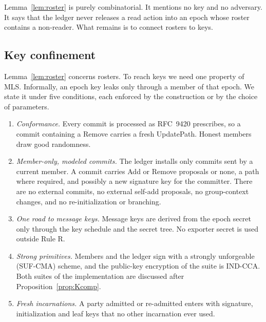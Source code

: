 \documentclass[aps,prx,reprint,superscriptaddress,nofootinbib,floatfix]{revtex4-2}
\theoremstyle{remark}
\begin{document}
Lemma~\ref{lem:roster} is purely combinatorial. It mentions no key and no adversary. It says that the ledger never releases a read action into an epoch whose roster contains a non-reader. What remains is to connect rosters to keys.

\subsection{Key confinement}\label{sec:K}

Lemma~\ref{lem:roster} concerns rosters. To reach keys we need one property of MLS. Informally, an epoch key leaks only through a member of that epoch. We state it under five conditions, each enforced by the construction or by the choice of parameters.
\begin{enumerate}
\item[K1.] \emph{Conformance.} Every commit is processed as RFC~9420 prescribes, so a commit containing a Remove carries a fresh UpdatePath. Honest members draw good randomness.
\item[K2.] \emph{Member-only, modeled commits.} The ledger installs only commits sent by a current member. A commit carries Add or Remove proposals or none, a path where required, and possibly a new signature key for the committer. There are no external commits, no external self-add proposals, no group-context changes, and no re-initialization or branching.
\item[K3.] \emph{One road to message keys.} Message keys are derived from the epoch secret only through the key schedule and the secret tree. No exporter secret is used outside Rule R.
\item[K4.] \emph{Strong primitives.} Members and the ledger sign with a strongly unforgeable (SUF-CMA) scheme, and the public-key encryption of the suite is IND-CCA. Both suites of the implementation are discussed after Proposition~\ref{prop:Kcomp}.
\item[K5.] \emph{Fresh incarnations.} A party admitted or re-admitted enters with signature, initialization and leaf keys that no other incarnation ever used.
\end{enumerate}
\end{document}
